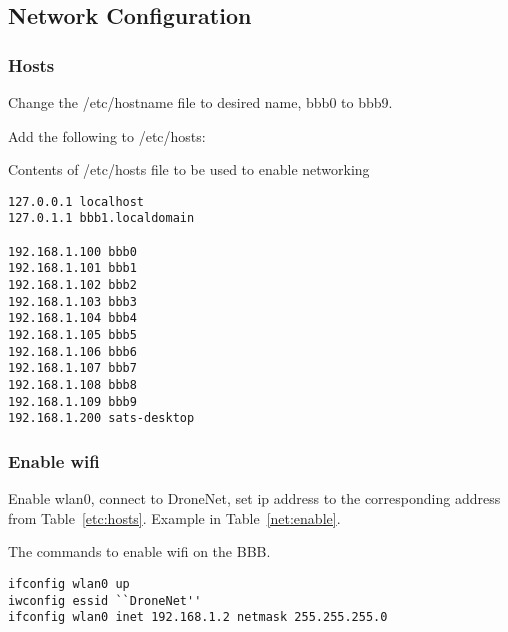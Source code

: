 \documentclass{article}
\begin{document}
\subsection{Network Configuration}
\subsubsection{Hosts}
Change the /etc/hostname file to desired name, bbb0 to bbb9. 

Add the following to /etc/hosts: 
\begin{table}[H]
    \label{etc:hosts}
    \caption{Contents of /etc/hosts file to be used to enable networking}
\begin{lstlisting}
127.0.0.1 localhost
127.0.1.1 bbb1.localdomain

192.168.1.100 bbb0
192.168.1.101 bbb1
192.168.1.102 bbb2
192.168.1.103 bbb3
192.168.1.104 bbb4
192.168.1.105 bbb5
192.168.1.106 bbb6
192.168.1.107 bbb7
192.168.1.108 bbb8
192.168.1.109 bbb9
192.168.1.200 sats-desktop
\end{lstlisting}
\end{table}

\subsubsection{Enable wifi}
Enable wlan0, connect to DroneNet, set ip address to the corresponding address from Table~\ref{etc:hosts}. Example in Table~\ref{net:enable}. 
\begin{table}
    \caption{The commands to enable wifi on the BBB. }
    \label{net:enable}
\begin{lstlisting}
ifconfig wlan0 up
iwconfig essid ``DroneNet''
ifconfig wlan0 inet 192.168.1.2 netmask 255.255.255.0
\end{lstlisting}
\end{table}
\end{document}
